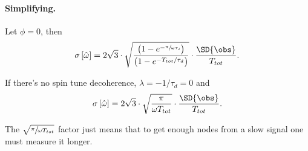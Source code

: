 \documentclass[14pt]{article}
\begin{document}
	
\paragraph{Simplifying.}
Let $\phi = 0$, then
\[
	\SE{\hat{\omega}} = 2\sqrt{3}\cdot\sqrt{\frac{\bkt{1-e^{-\sfrac{\pi}{\omega\tau_d}}}}{\bkt{1 - e^{-T_{tot}/\tau_d}}}}\cdot\frac{\SD{\obs}}{T_{tot}}.
\]

If there's no spin tune decoherence, $\lambda = -1/\tau_d = 0$ and
\[
	\SE{\hat{\omega}} = 2\sqrt{3}\cdot \sqrt{\frac{\pi}{\omega T_{tot}}}\cdot\frac{\SD{\obs}}{ T_{tot}}.
\]

The $\sqrt{\sfrac{\pi}{\omega T_{tot}}}$ factor just means that to get enough nodes from a slow signal one must measure it longer.
\end{document}
